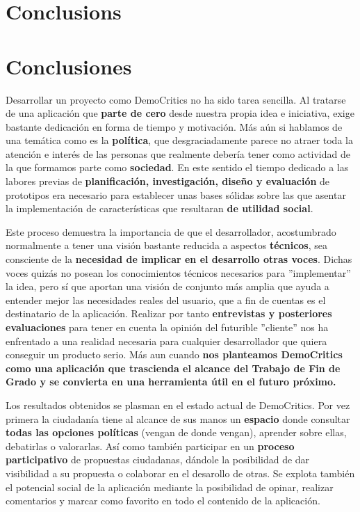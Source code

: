 \newpage
\chapter*{Conclusions}



\chapter*{Conclusiones}

Desarrollar un proyecto como DemoCritics no ha sido tarea sencilla. Al tratarse de una aplicación que \textbf{parte de cero} desde nuestra propia idea e iniciativa, exige bastante dedicación en forma de tiempo y motivación. Más aún si hablamos de una temática como es la \textbf{política}, que desgraciadamente parece no atraer toda la atención e interés de las personas que realmente debería tener como actividad de la que formamos parte como \textbf{sociedad}. En este sentido el tiempo dedicado a las labores previas de \textbf{planificación, investigación, diseño y evaluación} de prototipos era necesario para establecer unas bases sólidas sobre las que asentar la implementación de características que resultaran \textbf{de utilidad social}.

Este proceso demuestra la importancia de que el desarrollador, acostumbrado normalmente a tener una visión bastante reducida a aspectos \textbf{técnicos}, sea consciente de la \textbf{necesidad de implicar en el desarrollo otras voces}. Dichas voces quizás no posean los conocimientos técnicos necesarios para ''implementar'' la idea, pero sí que aportan una visión de conjunto más amplia que ayuda a entender mejor las necesidades reales del usuario, que a fin de cuentas es el destinatario de la aplicación. Realizar por tanto \textbf{entrevistas y posteriores evaluaciones} para tener en cuenta la opinión del futurible ''cliente'' nos ha enfrentado a una realidad necesaria para cualquier desarrollador que quiera conseguir un producto serio. Más aun cuando \textbf{nos planteamos DemoCritics como una aplicación que trascienda el alcance del Trabajo de Fin de Grado y se convierta en una herramienta útil en el futuro próximo.}

Los resultados obtenidos se plasman en el estado actual de DemoCritics. Por vez primera la ciudadanía tiene al alcance de sus manos un \textbf{espacio} donde consultar \textbf{todas las opciones políticas} (vengan de donde vengan), aprender sobre ellas, debatirlas o valorarlas. Así como también participar en un \textbf{proceso participativo} de propuestas ciudadanas, dándole la posibilidad de dar visibilidad a su propuesta o colaborar en el desarollo de otras. Se explota también el potencial social de la aplicación mediante la posibilidad de opinar, realizar comentarios y marcar como favorito en todo el contenido de la aplicación.

